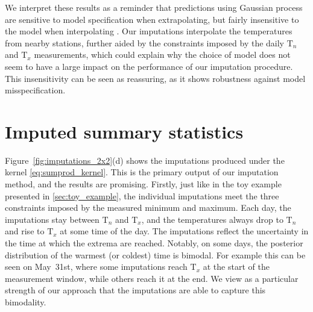 \documentclass[letter]{article}
\newcommand{\T}{\mathrm{T}}
\newcommand{\Tn}{\T_{n}}
\newcommand{\Tx}{\T_{x}}
\DeclareMathOperator{\ksumprod}{k_{\mathtt{sumprod}}}
\renewcommand{\cite}[1]{\citep{#1}}
\begin{document}
We interpret these results as a reminder that predictions using Gaussian process are sensitive to model specification when extrapolating, but fairly insensitive to the model when interpolating \cite{stein2012interpolation}.
Our imputations interpolate the temperatures from nearby stations, further aided by the constraints imposed by the daily \(\Tn\) and \(\Tx\) measurements, which could explain why the choice of model does not seem to have a large impact on the performance of our imputation procedure.
This insensitivity can be seen as reassuring, as it shows robustness against model misspecification.
    


        \section{Imputed summary statistics}\label{imputed-summary-statistics}
    


        Figure~\ref{fig:imputations_2x2}(d) shows the imputations produced under the \(\ksumprod\) kernel \eqref{eq:sumprod_kernel}.
This is the primary output of our imputation method, and the results are promising.
Firstly, just like in the toy example presented in \ref{sec:toy_example}, the individual imputations meet the three constraints imposed by the measured minimum and maximum.
Each day, the imputations stay between \(\Tn\) and \(\Tx\),
and the temperatures always drop to \(\Tn\) and rise to \(\Tx\) at some time of the day.
The imputations reflect the uncertainty in the time at which the extrema are reached.
Notably, on some days, the posterior distribution of the warmest (or coldest) time is bimodal.
For example this can be seen on May~31st, where some imputations reach \(\Tx\) at the start of the measurement window, while others reach it at the end.
We view as a particular strength of our approach that the imputations are able to capture this bimodality.
    
\end{document}
